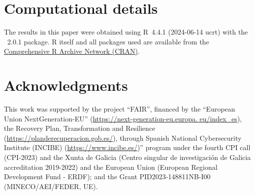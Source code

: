 \section*{Computational details}

The results in this paper were obtained using \textsf{R}~4.4.1 (2024-06-14 ucrt) with the ~2.0.1 package. \textsf{R} itself
and all packages used are available from the \href{https://CRAN.R-project.org/}{Comprehensive \textsf{R} Archive Network (CRAN)}.

\section*{Acknowledgments}
This work was supported by the project ``FAIR'', financed by the ``European Union NextGeneration-EU'' (\url{https://next-generation-eu.europa. eu/index_es}), the Recovery Plan, Transformation and Resilience (\url{https://planderecuperacion.gob.es/}), through Spanish National Cybersecurity Institute (INCIBE) (\url{https://www.incibe.es/})” program under the fourth CPI call (CPI-2023) and the Xunta de Galicia (Centro singular de investigaci\'{o}n de Galicia accreditation 2019-2022) and the European Union (European Regional Development Fund - ERDF); and the Grant PID2023-148811NB-I00 (MINECO/AEI/FEDER, UE).

\newpage


\address{Ines Ortega-Fernandez\\
  Galician Research and Development Center in Advanced Telecommunications (Gradiant), Vigo (Spain)\\
  ORCID: \href{https://orcid.org/0000-0002-8041-6860}{0000-0002-8041-6860} \\
  }

\address{Marta Sestelo\\
  Galician Centre for Mathematical Research and Technology (CITMAga), Santiago de Compostela (Spain)\\
  Universidade de Vigo, Department of Statistics and O.R. \& SiDOR Group, 36310 Vigo, Spain \\
  ORCID: \href{https://orcid.org/0000-0003-4284-6509}{0000-0003-4284-6509}\\
  }
